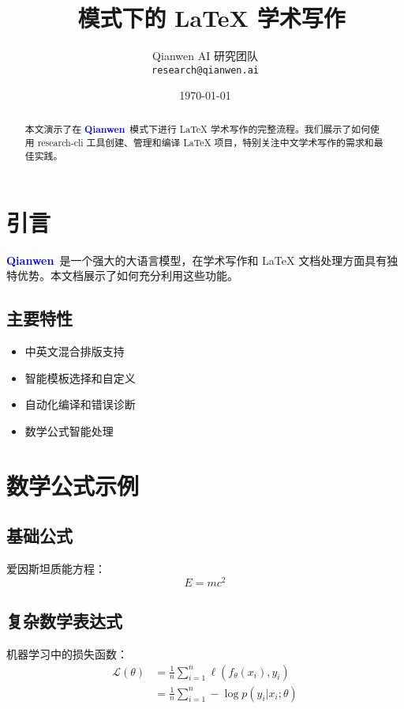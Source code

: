 \documentclass[11pt,a4paper]{article}
\title{\qianwen\ 模式下的 LaTeX 学术写作}
\author{
    Qianwen AI 研究团队 \\
    \texttt{research@qianwen.ai}
}
\date{\today}
\newcommand{\qianwen}{\textcolor{blue}{\textbf{Qianwen}}}
\begin{document}
\maketitle

\begin{abstract}
本文演示了在 \qianwen\ 模式下进行 LaTeX 学术写作的完整流程。我们展示了如何使用 research-cli 工具创建、管理和编译 LaTeX 项目，特别关注中文学术写作的需求和最佳实践。
\end{abstract}

\tableofcontents

\section{引言}

\qianwen\ 是一个强大的大语言模型，在学术写作和 LaTeX 文档处理方面具有独特优势。本文档展示了如何充分利用这些功能。

\subsection{主要特性}

\begin{itemize}
    \item 中英文混合排版支持
    \item 智能模板选择和自定义
    \item 自动化编译和错误诊断
    \item 数学公式智能处理
\end{itemize}

\section{数学公式示例}

\subsection{基础公式}

爱因斯坦质能方程：
\begin{equation}
    E = mc^2
    \label{eq:einstein}
\end{equation}

\subsection{复杂数学表达式}

机器学习中的损失函数：
\begin{align}
    \mathcal{L}(\theta) &= \frac{1}{n} \sum_{i=1}^{n} \ell(f_\theta(x_i), y_i) \\
    &= \frac{1}{n} \sum_{i=1}^{n} -\log p(y_i | x_i; \theta)
\end{align}
\end{document}
